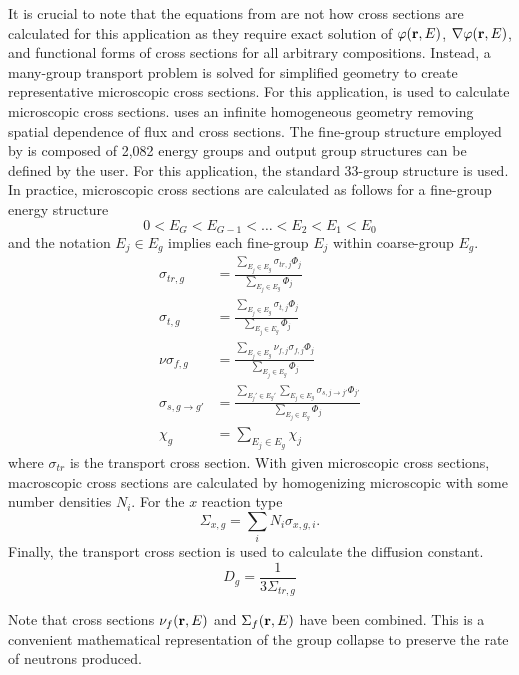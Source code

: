   It is crucial to note that the equations from \cite{duderstathamilton} are not
  how cross sections are calculated for this application as they require exact
  solution of $\varphi(\mathbf{r},E)$, $\mathbf{\nabla} \varphi(\mathbf{r},E)$, and functional forms of
  cross sections for all arbitrary compositions. Instead, a many-group transport
  problem is solved for simplified geometry to create representative microscopic
  cross sections. For this application, \mcc is used to calculate microscopic
  cross sections. \mcc uses an infinite homogeneous geometry removing spatial
  dependence of flux and cross sections. The fine-group structure employed by 
  \mcc is composed of 2,082 energy groups and output group structures can be
  defined by the user. For this application, the standard 33-group structure is
  used.
  In practice, microscopic cross sections are calculated as follows for a
  fine-group energy structure 
  \[ 0 < E_G < E_{G-1} < \ldots < E_2 < E_1 < E_0 \]
  and the notation $E_j \in E_g$ implies each fine-group $E_j$ within
  coarse-group $E_g$.
  \begin{align}
    \sigma_{tr,g} &= \frac{\sum_{E_j \in E_g} \sigma_{tr,j} \Phi_j}
      {\sum_{E_j \in E_g} \Phi_j} \\
    \sigma_{t,g} &= \frac{\sum_{E_j \in E_g} \sigma_{t,j} \Phi_j}
      {\sum_{E_j \in E_g} \Phi_j} \\
    \nu \sigma_{f,g} &= \frac{\sum_{E_j \in E_g} \nu_{f,j} \sigma_{f,j}
      \Phi_j}{\sum_{E_j \in E_g} \Phi_j} \\
    \sigma_{s,g \rightarrow g'} &= \frac{\sum_{E_j' \in E_g'} \sum_{E_j \in E_g}
      \sigma_{s,j \rightarrow j'} \Phi_{j'}}{\sum_{E_j \in E_g} \Phi_j} \\
    \chi_g &= \sum_{E_j \in E_g} \chi_j
  \end{align}
  where $\sigma_{tr}$ is the transport cross section.
  With given microscopic cross sections, macroscopic cross sections are
  calculated by homogenizing microscopic with some number densities $N_i$. 
  For the $x$ reaction type
  \begin{equation}
    \Sigma_{x,g} = \sum_{i} N_i \sigma_{x,g,i}.
  \end{equation}
  Finally, the transport cross section is used to calculate the diffusion
  constant.
  \begin{equation}
    D_g = \frac{1}{3 \Sigma_{tr,g}}
  \end{equation}

  Note that cross sections $\nu_f(\mathbf{r},E)$ and $\Sigma_f(\mathbf{r},E)$ have been 
  combined. This is a convenient mathematical representation of the group
  collapse to preserve the rate of neutrons produced.

